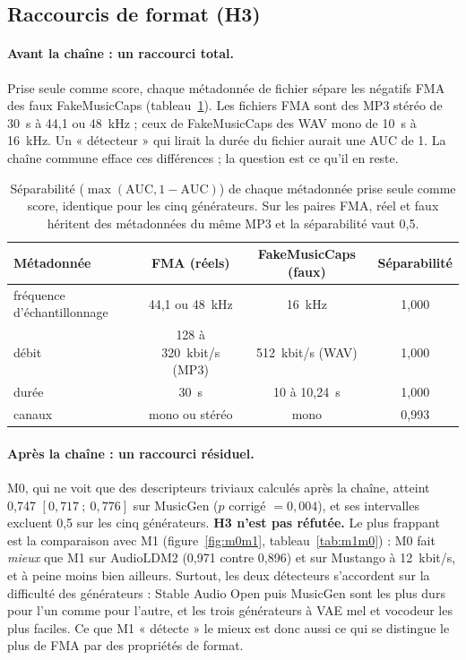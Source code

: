 \documentclass[a4paper, 11pt]{article}
\begin{document}
\subsection{Raccourcis de format (H3)}

\paragraph{Avant la chaîne : un raccourci total.} Prise seule comme score, chaque métadonnée de fichier
sépare les négatifs FMA des faux FakeMusicCaps (tableau~\ref{tab:meta}). Les fichiers FMA sont des MP3
stéréo de 30~s à 44,1 ou 48~kHz ; ceux de FakeMusicCaps des WAV mono de 10~s à 16~kHz. Un « détecteur »
qui lirait la durée du fichier aurait une AUC de 1. La chaîne commune efface ces différences ; la question
est ce qu'il en reste.

\begin{table}[h]
    \centering
    \small
    \begin{tabular}{lccc}
        \toprule
        Métadonnée & FMA (réels) & FakeMusicCaps (faux) & Séparabilité \\
        \midrule
        fréquence d'échantillonnage & 44,1 ou 48~kHz & 16~kHz & 1,000 \\
        débit & 128 à 320~kbit/s (MP3) & 512~kbit/s (WAV) & 1,000 \\
        durée & 30~s & 10 à 10,24~s & 1,000 \\
        canaux & mono ou stéréo & mono & 0,993 \\
        \bottomrule
    \end{tabular}
    \caption{Séparabilité ($\max(\mathrm{AUC}, 1-\mathrm{AUC})$) de chaque métadonnée prise seule comme
    score, identique pour les cinq générateurs. Sur les paires FMA, réel et faux héritent des métadonnées du
    même MP3 et la séparabilité vaut 0,5.}
    \label{tab:meta}
\end{table}

\paragraph{Après la chaîne : un raccourci résiduel.} M0, qui ne voit que des descripteurs triviaux calculés
après la chaîne, atteint 0,747 $[0{,}717~;~0{,}776]$ sur MusicGen ($p$ corrigé $= 0{,}004$), et ses
intervalles excluent 0,5 sur les cinq générateurs. \textbf{H3 n'est pas réfutée.} Le plus frappant est la
comparaison avec M1 (figure~\ref{fig:m0m1}, tableau~\ref{tab:m1m0}) : M0 fait \emph{mieux} que M1 sur
AudioLDM2 (0,971 contre 0,896) et sur Mustango à 12~kbit/s, et à peine moins bien ailleurs. Surtout, les
deux détecteurs s'accordent sur la difficulté des générateurs : Stable Audio Open puis MusicGen sont les
plus durs pour l'un comme pour l'autre, et les trois générateurs à VAE mel et vocodeur les plus faciles. Ce
que M1 « détecte » le mieux est donc aussi ce qui se distingue le plus de FMA par des propriétés de format.
\end{document}
